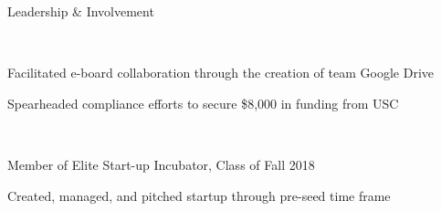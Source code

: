 \documentclass{resume} %
\begin{document}
\begin{rSection}{Leadership \& Involvement}

\company{\uscih}{\la} \\
 \smallskip
\begin{rList}
\item Facilitated e-board collaboration through the creation of team Google Drive
\item Spearheaded compliance efforts to secure \$8,000 in funding from USC
\end{rList}
 \smallskip
\vspace{0.5em}


\company{\lavalab}{\la} \\
 \smallskip
\begin{rList}
\item Member of Elite Start-up Incubator, Class of Fall 2018
\item Created, managed, and pitched startup through pre-seed time frame
\end{rList}

\end{rSection}

\end{document}
